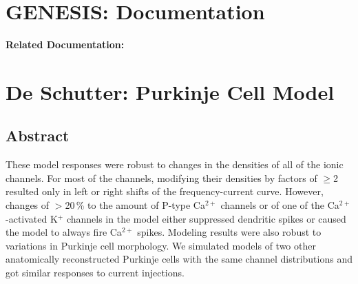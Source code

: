\documentclass[12pt]{article}
\begin{document}
\section*{GENESIS: Documentation}

{\bf Related Documentation:}

\section*{De Schutter: Purkinje Cell Model}

\subsection*{Abstract}

These model responses were robust to changes in the densities
of all of the ionic channels. For most of the channels, modifying
their densities by factors of $\geq$2 resulted only in left or right
shifts of the frequency-current curve. However, changes of $>$20\,\%
to the amount of P-type Ca$^{2+}$ channels or of one of the Ca$^{2+}$-activated
K$^+$ channels in the model either suppressed dendritic spikes
or caused the model to always fire Ca$^{2+}$ spikes. Modeling results
were also robust to variations in Purkinje cell morphology. We
simulated models of two other anatomically reconstructed Purkinje
cells with the same channel distributions and got similar
responses to current injections.
\end{document}
